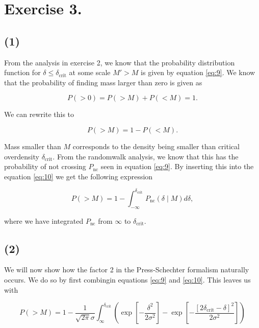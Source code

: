 \documentclass[a4paper,10pt]{article}
\begin{document}
\section*{Exercise 3.}
\subsection*{(1)}

From the analysis in exercise 2, we know that the probability distribution function for $\delta \leq \delta_\text{crit}$ at some scale $M' > M$ is given by equation \eqref{eq:9}. We know that the probability of finding mass larger than zero is given as

\[
    P(> 0) = P( > M) + P( < M) = 1.
\]

\noindent We can rewrite this to

\begin{equation}\label{eq:10}
    P( > M ) = 1 - P ( < M ).
\end{equation}

\noindent Mass smaller than $M$ corresponds to the density being smaller than critical overdensity $\delta_\text{crit}$. From the randomwalk analysis, we know that this has the probability of not crossing $P_\text{nc}$ seen in equation \eqref{eq:9}. By inserting this into the equation \eqref{eq:10} we get the following expression

\begin{equation}\label{eq:10}
    P(> M) = 1 - \int_{-\infty}^{\delta_\text{crit}} P_\text{nc} (\delta \mid M) d\delta,
\end{equation}

\noindent where we have integrated $P_\text{nc}$ from $\infty$ to $\delta_\text{crit}$.

\subsection*{(2)}

We will now show how the factor 2 in the Press-Schechter formalism naturally occurs. We do so by first combingin equations \eqref{eq:9} and \eqref{eq:10}. This leaves us with 

\begin{equation}\label{eq:11}
    P(> M) = 1 - \frac{1}{\sqrt{2 \pi} \sigma} \int_\infty^{\delta_\text{crit}} \left( \exp \left[- \frac{\delta^2}{2\sigma^2} \right] - \exp \left[ - \frac{[2\delta_\text{crit} - \delta]^2 }{2\sigma^2} \right] \right)
\end{equation}
\end{document}
